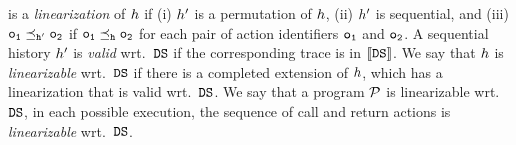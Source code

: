 is a {\it linearization} of $h$ if
(i) $h'$ is a permutation of $h$,
(ii) $h'$ is sequential, 
and
(iii) $\tt o_1\preceq_{h'}\tt o_2$
if $\tt o_1\preceq_{h}\tt o_2$
for each pair of action identifiers $\tt o_1$ and $\tt o_2$.
%
A sequential history $h'$ is {\it valid} wrt.\ ${\tt DS}$ if
the corresponding trace is in $\left\llbracket{{\tt DS}}\right\rrbracket$.
%
We say that $h$ is {\it linearizable} wrt.\ ${\tt DS}$ if there is
a completed extension of $h$, which has
a linearization that is valid wrt.\ ${\tt DS}$.
%
We say that a program ${\mathcal P}$ is linearizable wrt.\ 
${\tt DS}$, in each possible execution, the sequence of call and return actions
is {\em linearizable} wrt.\ ${\tt DS}$.












